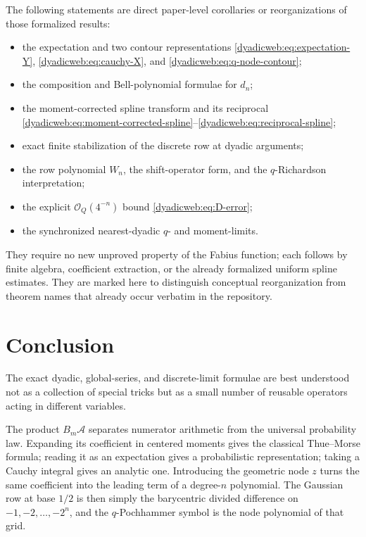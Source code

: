 \documentclass[11pt,oneside]{article}
\theoremstyle{definition}
\theoremstyle{remark}
\newcommand{\bigO}{\mathcal O}
\begin{document}
The following statements are direct paper-level corollaries or reorganizations of those
formalized results:
\begin{itemize}
\item the expectation and two contour representations
      \eqref{dyadicweb:eq:expectation-Y}, \eqref{dyadicweb:eq:cauchy-X}, and \eqref{dyadicweb:eq:q-node-contour};
\item the composition and Bell-polynomial formulae for $d_n$;
\item the moment-corrected spline transform and its reciprocal
      \eqref{dyadicweb:eq:moment-corrected-spline}--\eqref{dyadicweb:eq:reciprocal-spline};
\item exact finite stabilization of the discrete row at dyadic arguments;
\item the row polynomial $W_n$, the shift-operator form, and the $q$-Richardson interpretation;
\item the explicit $\bigO_Q(4^{-n})$ bound \eqref{dyadicweb:eq:D-error};
\item the synchronized nearest-dyadic $q$- and moment-limits.
\end{itemize}
They require no new unproved property of the Fabius function; each follows by finite algebra,
coefficient extraction, or the already formalized uniform spline estimates.  They are marked
here to distinguish conceptual reorganization from theorem names that already occur verbatim
in the repository.

\section{Conclusion}
\label{dyadicweb:sec:conclusion}

The exact dyadic, global-series, and discrete-limit formulae are best understood not as a
collection of special tricks but as a small number of reusable operators acting in different
variables.

The product $B_m\mathscr A$ separates numerator arithmetic from the universal probability
law.  Expanding its coefficient in centered moments gives the classical Thue--Morse formula;
reading it as an expectation gives a probabilistic representation; taking a Cauchy integral
gives an analytic one.  Introducing the geometric node $z$ turns the same coefficient into
the leading term of a degree-$n$ polynomial.  The Gaussian row at base $1/2$ is then simply
the barycentric divided difference on $-1,-2,\ldots,-2^n$, and the $q$-Pochhammer symbol is the
node polynomial of that grid.
\end{document}
